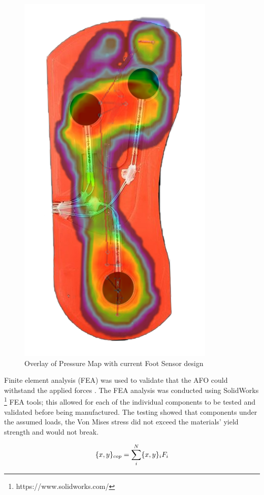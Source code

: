 \begin{figure}[h!]
    \centering
    \includegraphics[scale=0.25, angle =-90 , frame]{images/mech_design/sole.png}
    \caption[Pressure Map of Foot]{Overlay of Pressure Map with current Foot Sensor design}
    \label{fig:Foot-Force Mapping}
\end{figure}

Finite element analysis (FEA) was used to validate that the AFO could withstand the applied forces \cite{akin2010finite}. The FEA analysis was conducted using SolidWorks \footnote{https://www.solidworks.com/} FEA tools; this allowed for each of the individual components to be tested and validated before being manufactured. The testing showed that components under the assumed loads, the Von Mises \cite{shigley} stress did not exceed the materials' yield strength and would not break.

\begin{equation}
\large
    \{x,y\}_{cop} = \sum_{i}^{N} \{x,y\}_i F_i
    \label{eq:FSRCoP}
\end{equation}


